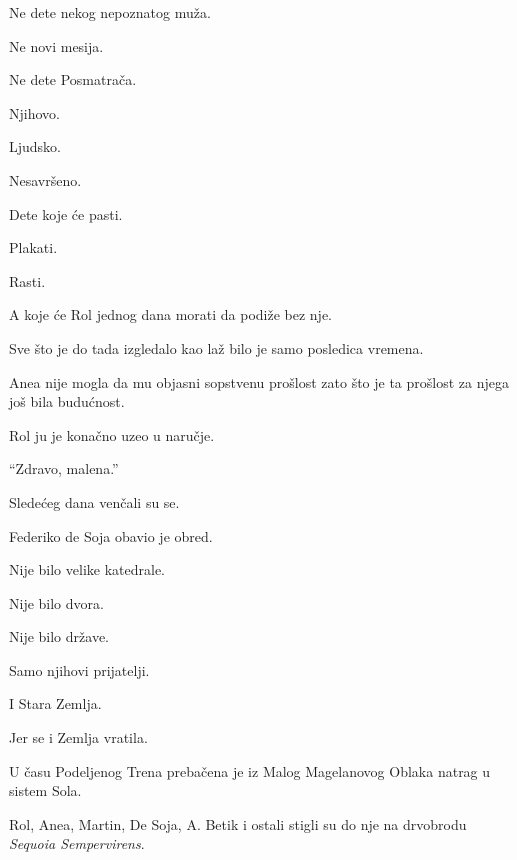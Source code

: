 \bigskip

Ne dete nekog nepoznatog muža.

Ne novi mesija.

Ne dete Posmatrača.

\bigskip

Njihovo.

\bigskip

Ljudsko.

\bigskip

Nesavršeno.

\bigskip

Dete koje će pasti.

Plakati.

Rasti.

\bigskip

A koje će Rol jednog dana morati da podiže bez nje.

\bigskip

Sve što je do tada izgledalo kao laž bilo je samo posledica vremena.

\bigskip

Anea nije mogla da mu objasni sopstvenu prošlost zato što je ta prošlost za njega još bila budućnost.

\bigskip

Rol ju je konačno uzeo u naručje.

\bigskip

``Zdravo, malena.''

\bigskip

Sledećeg dana venčali su se.

\bigskip

Federiko de Soja obavio je obred.

\bigskip

Nije bilo velike katedrale.

Nije bilo dvora.

Nije bilo države.

\bigskip

Samo njihovi prijatelji.

\bigskip

I Stara Zemlja.

\bigskip

Jer se i Zemlja vratila.

\bigskip

U času Podeljenog Trena prebačena je iz Malog Magelanovog Oblaka natrag u sistem Sola.

\bigskip

Rol, Anea, Martin, De Soja, A. Betik i ostali stigli su do nje na drvobrodu \emph{Sequoia Sempervirens}.

